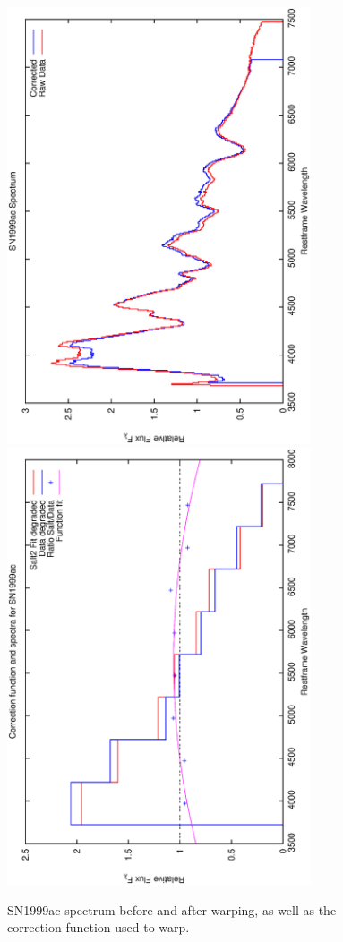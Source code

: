 \clearpage

\begin{figure}[p]
\centering
\includegraphics[angle=-90,width=0.8\textwidth]{./figures/spectrabeforeafter/SN1999ac_handpicked_v001_v024_before_after_spectra.ps}
\hfill
\includegraphics[angle=-90,width=0.8\textwidth]{./figures/corrections/SN1999ac_v001_correction.ps}
\hfill
\caption{SN1999ac spectrum before and after warping, as well as the correction function used to warp.}
\label{fig:SN1999acfour1}
\end{figure}

